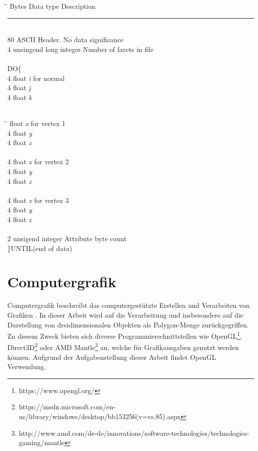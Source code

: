 \begin{center}\parbox{0cm}{
	\begin{tabbing}
	 	\hspace*{2cm}\=\hspace*{5cm}\= \kill
	 	Bytes \> Data type\> Description\\
		\noindent\rule{11.8cm}{0.4pt}\\
		80 \>ASCII \>Header. No data significance\\
		4 \>unsingend long integer \>Number of facets in file\\\\
		DO\{\\
		4 \>float \>\textit{i} for normal\\
		4 \>float \>\textit{j}\\
		4 \>float \>\textit{k}\\\\
			\end{tabbing}}
		\end{center}
		\begin{center}\parbox{0cm}{
				\begin{tabbing}
					\hspace*{2cm}\=\hspace*{5cm}\=  \>float \>\textit{x} for vertex 1\\
		4 \>float \>\textit{y}\\
		4 \>float \>\textit{z}\\\\
		4 \>float \>\textit{x} for vertex 2\\
		4 \>float \>\textit{y}\\
		4 \>float \>\textit{z}\\\\
		4 \>float \>\textit{x} for vertex 3\\
		4 \>float \>\textit{y}\\
		4 \>float \>\textit{z}\\\\
		2 \>unsigend integer \>Attribute byte count\\
		\}UNTIL(end of data)
	\end{tabbing}}
\end{center}

\section{Computergrafik}
Computergrafik beschreibt das computergestützte Erstellen und Verarbeiten von Grafiken \citep{ComputerGraphics}. In dieser Arbeit wird auf die Verarbeitung und insbesondere auf die Darstellung von dreidimensionalen Objekten als Polygon-Menge zurückgegriffen. Zu diesem Zweck bieten sich diverse Programmierschnittstellen wie OpenGL\footnote{https://www.opengl.org/}, Direct3D\footnote{https://msdn.microsoft.com/en-us/library/windows/desktop/bb153256(v=vs.85).aspx} oder AMD Mantle\footnote{http://www.amd.com/de-de/innovations/software-technologies/technologies-gaming/mantle} an, welche für Grafikausgaben genutzt werden können. Aufgrund der Aufgabenstellung dieser Arbeit findet OpenGL Verwendung.
